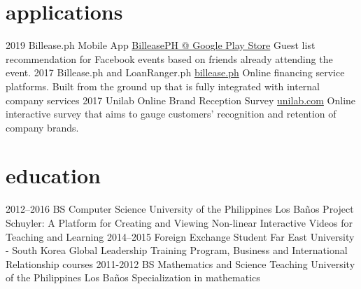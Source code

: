 \documentclass[]{friggeri-cv}
\begin{document}
\section{applications}

\begin{entrylist}
  \entry
    {2019}
    {Billease.ph Mobile App}
    {\href{https://play.google.com/store/apps/details?id=ph.billeasev2.mobile}{BilleasePH @ Google Play Store}}
    {Guest list recommendation for Facebook events based on friends already attending the event.}
  \entry
    {2017}
    {Billease.ph and LoanRanger.ph}
    {\href{https://billease.ph}{billease.ph}}
    {Online financing service platforms. Built from the ground up that is fully integrated with
    internal company services}
  \entry
    {2017}
    {Unilab Online Brand Reception Survey}
    {\href{https://www.unilab.com.ph/}{unilab.com}}
    {Online interactive survey that aims to gauge customers' recognition and retention of company brands.}
\end{entrylist}

\section{education}

\begin{entrylist}
  \entry
    {2012–2016}
    {BS Computer Science}
    {University of the Philippines Los Ba{\~{n}}os}
    {Project Schuyler: A Platform for Creating and Viewing Non-linear Interactive Videos for Teaching and Learning}
  \entry
    {2014–2015}
    {Foreign Exchange Student}
    {Far East University - South Korea}
    {Global Leadership Training Program, Business and International Relationship courses}
  \entry
    {2011-2012}
    {BS Mathematics and Science Teaching}
    {University of the Philippines Los Ba{\~{n}}os}
    {Specialization in mathematics}
\end{entrylist}
\end{document}
